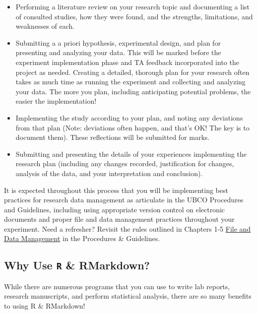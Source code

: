 \documentclass[
]{book}
\providecommand{\tightlist}{%
  \setlength{\itemsep}{0pt}\setlength{\parskip}{0pt}}
\begin{document}
\begin{itemize}
\tightlist
\item
  Performing a literature review on your research topic and documenting a list of consulted studies, how they were found, and the strengths, limitations, and weaknesses of each.
\item
  Submitting a a priori hypothesis, experimental design, and plan for presenting and analyzing your data. This will be marked before the experiment implementation phase and TA feedback incorporated into the project as needed. Creating a detailed, thorough plan for your research often takes as much time as running the experiment and collecting and analyzing your data. The more you plan, including anticipating potential problems, the easier the implementation!
\item
  Implementing the study according to your plan, and noting any deviations from that plan (Note: deviations often happen, and that's OK! The key is to document them). These reflections will be submitted for marks.
\item
  Submitting and presenting the details of your experiences implementing the research plan (including any changes recorded, justification for changes, analysis of the data, and your interpretation and conclusion).
\end{itemize}

It is expected throughout this process that you will be implementing best practices for research data management as articulate in the UBCO Procedures and Guidelines, including using appropriate version control on electronic documents and proper file and data management practices throughout your experiment. Need a refresher? Revisit the rules outlined in Chapters 1-5 \href{https://ubco-biology.github.io/Procedures-and-Guidelines/file-and-data-management.html}{File and Data Management} in the Procedures \& Guidelines.

\hypertarget{why-use-r-rmarkdown}{%
\subsection*{\texorpdfstring{Why Use \texttt{R} \& RMarkdown?}{Why Use R \& RMarkdown?}}\label{why-use-r-rmarkdown}}

While there are numerous programs that you can use to write lab reports, research manuscripts, and perform statistical analysis, there are so many benefits to using R \& RMarkdown!
\end{document}
